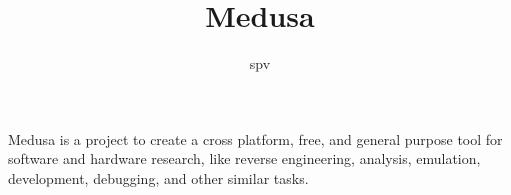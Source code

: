 \documentclass{article}
\title{Medusa}
\author{spv}
\begin{document}
	\maketitle

	Medusa is a project to create a cross platform, free, and general purpose
    tool for software and hardware research, like reverse engineering, analysis,
    emulation, development, debugging, and other similar tasks.
\end{document}
